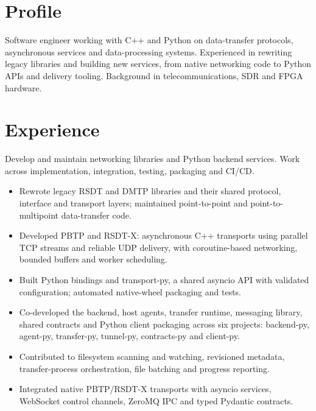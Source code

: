 \documentclass[10pt,a4paper]{article}
\begin{document}

\section*{Profile}
Software engineer working with C++ and Python on data-transfer protocols,
asynchronous services and data-processing systems. Experienced in rewriting
legacy libraries and building new services, from native networking code to
Python APIs and delivery tooling. Background in telecommunications, SDR and FPGA
hardware.

\section*{Experience}
Develop and maintain networking libraries and Python backend services.
Work across implementation, integration, testing, packaging and CI/CD.

\begin{itemize}
  \item Rewrote legacy RSDT and DMTP libraries and their shared protocol,
    interface and transport layers; maintained point-to-point and
    point-to-multipoint data-transfer code.
  \item Developed PBTP and RSDT-X: asynchronous C++ transports using parallel
    TCP streams and reliable UDP delivery, with coroutine-based networking,
    bounded buffers and worker scheduling.
  \item Built Python bindings and transport-py, a shared asyncio API
    with validated configuration; automated native-wheel packaging and tests.
\end{itemize}

\begin{itemize}
  \item Co-developed the backend, host agents, transfer runtime, messaging
    library, shared contracts and Python client packaging across six projects:
    backend-py, agent-py, transfer-py, tunnel-py, contracts-py and client-py.
  \item Contributed to filesystem scanning and watching, revisioned metadata,
    transfer-process orchestration, file batching and progress reporting.
  \item Integrated native PBTP/RSDT-X transports with asyncio services,
    WebSocket control channels, ZeroMQ IPC and typed Pydantic contracts.
\end{itemize}
\end{document}
